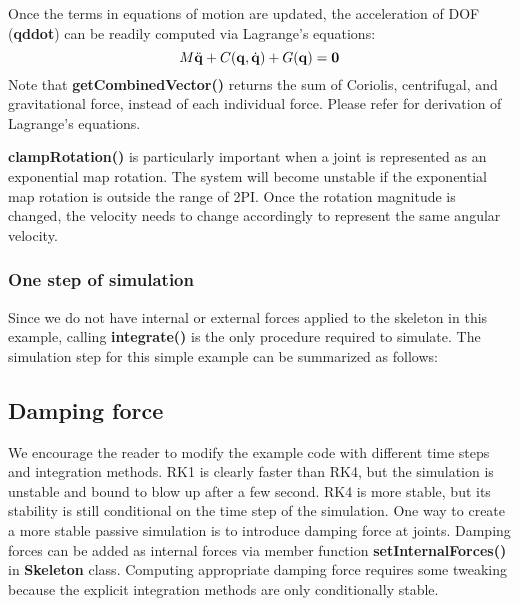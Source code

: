 Once the terms in equations of motion are updated, the acceleration of
DOF (\textbf{qddot}) can be readily computed via Lagrange's equations:
\begin{equation}
M \ddot{\mathbf{q}} + C(\mathbf{q}, \dot{\mathbf{q}}) + G(\mathbf{q}) = \mathbf{0}
\end{equation}
Note that \textbf{getCombinedVector()} returns the sum of Coriolis,
centrifugal, and gravitational force, instead of each individual
force. Please refer \cite{dynamic-tutorial} for derivation of
Lagrange's equations.

\textbf{clampRotation()} is particularly important when a joint is
represented as an exponential map rotation. The system will become
unstable if the exponential map rotation is outside the range of
2PI. Once the rotation magnitude is changed, the velocity needs to
change accordingly to represent the same angular velocity.

\subsubsection{One step of simulation}
Since we do not have internal or external forces applied to the
skeleton in this example, calling \textbf{integrate()} is the only
procedure required to simulate. The simulation step for this simple
example can be summarized as follows:


\subsection{Damping force}
We encourage the reader to modify the example code with different time
steps and integration methods. RK1 is clearly faster than RK4, but the
simulation is unstable and bound to blow up after a few second. RK4 is
more stable, but its stability is still conditional on the time step
of the simulation. One way to create a more stable passive simulation
is to introduce damping force at joints. Damping forces can be added
as internal forces via member function \textbf{setInternalForces()} in
\textbf{Skeleton} class. Computing appropriate damping force requires
some tweaking because the explicit integration methods are only
conditionally stable. 

